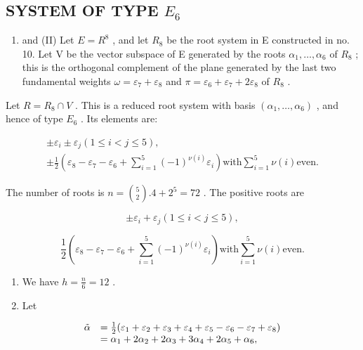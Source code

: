 \subsection{\texorpdfstring{SYSTEM OF TYPE \(E_{6}\)}{SYSTEM OF TYPE E\_6}}

\begin{enumerate}
\def\labelenumi{(\Roman{enumi})}
\tightlist
\item
  and (II) Let \(E = R^{8}\) , and let \(R_{8}\) be the root system in E constructed in no. 10. Let V be the vector subspace of E generated by the roots \(\alpha_{1}, \ldots, \alpha_{6}\) of \(R_{8}\) ; this is the orthogonal complement of the plane generated by the last two fundamental weights \(\omega = \varepsilon_{7} + \varepsilon_{8}\) and \(\pi = \varepsilon_{6} + \varepsilon_{7} + 2\varepsilon_{8}\) of \(R_{8}\) .
\end{enumerate}

Let \(R = R_{8} \cap V\) . This is a reduced root system with basis \((\alpha_{1}, \ldots, \alpha_{6})\) , and hence of type \(E_{6}\) . Its elements are:

\[
\begin{array}{c} \pm \varepsilon_ {i} \pm \varepsilon_ {j} (1 \leqslant i <   j \leqslant 5), \\ \pm \frac {1}{2} (\varepsilon_ {8} - \varepsilon_ {7} - \varepsilon_ {6} + \sum_ {i = 1} ^ {5} (- 1) ^ {\nu (i)} \varepsilon_ {i}) \text {with} \sum_ {i = 1} ^ {5} \nu (i) \text {even.} \end{array}
\]

The number of roots is \(n = \binom{5}{2}.4 + 2^5 = 72\) . The positive roots are

\[
\pm \varepsilon_ {i} + \varepsilon_ {j} (1 \leqslant i <   j \leqslant 5),
\]

\[
\frac {1}{2} \left(\varepsilon_ {8} - \varepsilon_ {7} - \varepsilon_ {6} + \sum_ {i = 1} ^ {5} (- 1) ^ {\nu (i)} \varepsilon_ {i}\right) \text {with} \sum_ {i = 1} ^ {5} \nu (i) \text {even}.
\]

\begin{enumerate}
\def\labelenumi{(\Roman{enumi})}
\setcounter{enumi}{2}
\item
  We have \(h = \frac{n}{6} = 12\) .
\item
  Let
\end{enumerate}

\[
\begin{array}{r l} \tilde {\alpha} & = \frac {1}{2} (\varepsilon_ {1} + \varepsilon_ {2} + \varepsilon_ {3} + \varepsilon_ {4} + \varepsilon_ {5} - \varepsilon_ {6} - \varepsilon_ {7} + \varepsilon_ {8}) \\ & = \alpha_ {1} + 2 \alpha_ {2} + 2 \alpha_ {3} + 3 \alpha_ {4} + 2 \alpha_ {5} + \alpha_ {6}, \end{array}
\]

